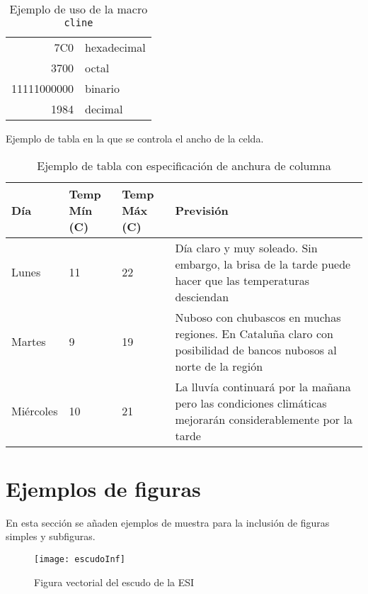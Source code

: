 \begin{table}[htb]%
	\centering
	\caption{Ejemplo de uso de la macro \texttt{cline}}
	\label{tab:cline}
	\begin{tabular}[t]{|r|l|}
		\hline
		7C0 & hexadecimal \\[1cm] %
		3700 & octal \\ \cline{2-2}
		11111000000 & binario \\
		\hline \hline
		1984 & decimal \\
		\hline
	\end{tabular}
\end{table}


\noindent Ejemplo de tabla en la que se controla el ancho de la celda.

\begin{table}[htb]%
	\centering
	\caption{Ejemplo de tabla con especificación de anchura de columna}
	\label{tab:anchura}
	\begin{tabular}{ | l | l | l | p{5cm} |}
		\hline
		Día & Temp Mín (\textdegree C) & Temp Máx (\textdegree C) & Previsión \\ \hline
		Lunes & 11 & 22 & Día claro y muy soleado. Sin embargo, la brisa de la tarde puede hacer que las temperaturas desciendan \\ \hline
		Martes & 9 & 19 & Nuboso con chubascos en muchas regiones. En Cataluña claro con posibilidad de bancos nubosos al norte de la región \\ \hline
		Miércoles & 10 & 21 & La lluvía continuará por la mañana pero las condiciones climáticas mejorarán considerablemente por la tarde\\
		\hline
	\end{tabular}
\end{table}

\clearpage


\section{Ejemplos de figuras}
\label{sec:ejFiguras}

En esta sección se añaden ejemplos de muestra para la inclusión de figuras simples y subfiguras.

\begin{figure}[htb]
	\centering
	\texttt{[image: escudoInf]}
	\caption[Ejemplo de figura]{Figura vectorial del escudo de la ESI}
	\label{fig:ejFigure}
\end{figure}


